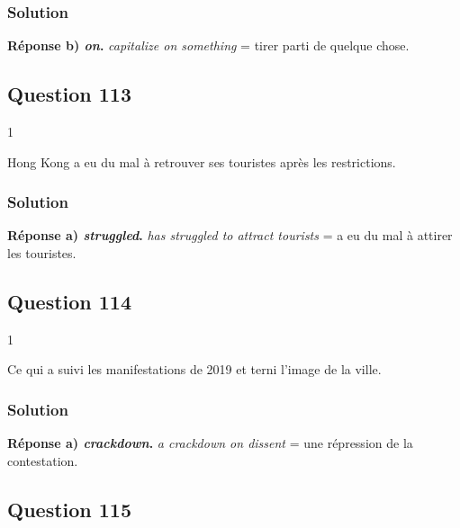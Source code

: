 \documentclass[11pt,a4paper]{article}
\begin{document}
\hypertarget{solution-111}{%
\subsubsection{Solution}\label{solution-111}}

\textbf{Réponse b) \emph{on}.} \emph{capitalize on something} = tirer parti de quelque chose.

\hypertarget{question-113}{%
\subsection{Question 113}\label{question-113}}

\begin{indication}{1}

Hong Kong a eu du mal à retrouver ses touristes après les restrictions.

\end{indication}

\hypertarget{solution-112}{%
\subsubsection{Solution}\label{solution-112}}

\textbf{Réponse a) \emph{struggled}.} \emph{has struggled to attract tourists} = a eu du mal à attirer les touristes.

\hypertarget{question-114}{%
\subsection{Question 114}\label{question-114}}

\begin{indication}{1}

Ce qui a suivi les manifestations de 2019 et terni l'image de la ville.

\end{indication}

\hypertarget{solution-113}{%
\subsubsection{Solution}\label{solution-113}}

\textbf{Réponse a) \emph{crackdown}.} \emph{a crackdown on dissent} = une répression de la contestation.

\hypertarget{question-115}{%
\subsection{Question 115}\label{question-115}}
\end{document}
